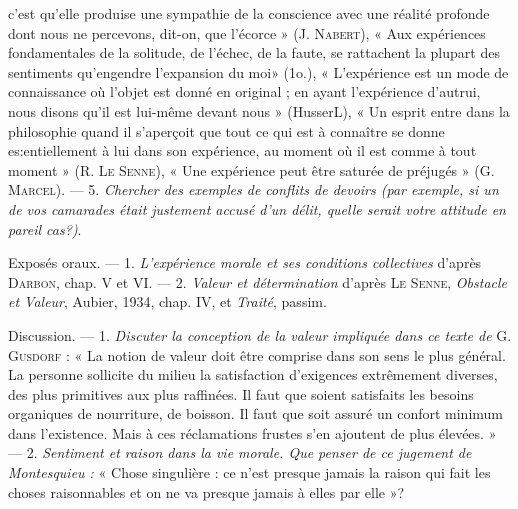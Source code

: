 c’est qu’elle produise une sympathie de la conscience avec une réalité profonde
dont nous ne percevons, dit-on, que l'écorce » (J. \textsc{Nabert}), « Aux
expériences fondamentales de la solitude, de l’échec, de la faute, se rattachent
la plupart des sentiments qu’engendre l’expansion du moi» (1o.),
« L'expérience est un mode de connaissance où l’objet est donné en original ;
en ayant l'expérience d'autrui, nous disons qu'il est lui-même devant nous »
(HusserL), « Un esprit entre dans la philosophie quand il s'aperçoit que
tout ce qui est à connaître se donne es:entiellement à lui dans son expérience,
au moment où il est comme à tout moment » (R. \textsc{Le Senne}), « Une
expérience peut être saturée de préjugés » (G. \textsc{Marcel}). — 5. {\it Chercher des
exemples de conflits de devoirs (par exemple, si un de vos camarades était justement
accusé d'un délit, quelle serait votre attitude en pareil cas?)}.

Exposés oraux. — 1. {\it L'expérience morale et ses conditions collectives}
d’après \textsc{Darbon}, chap. V et VI. — 2. {\it Valeur et détermination} d’après
\textsc{Le Senne}, {\it Obstacle et Valeur}, Aubier, 1934, chap. IV, et {\it Traité}, passim.

Discussion. — 1. {\it Discuter la conception de la valeur impliquée dans ce texte
de} G. \textsc{Gusdorf} : « La notion de valeur doit être comprise dans son sens le
plus général. La personne sollicite du milieu la satisfaction d’exigences
extrêmement diverses, des plus primitives aux plus raffinées. Il faut que
soient satisfaits les besoins organiques de nourriture, de boisson. Il faut
que soit assuré un confort minimum dans l’existence. Mais à ces réclamations
frustes s’en ajoutent de plus élevées. » — 2. {\it Sentiment et raison dans
la vie morale. Que penser de ce jugement de Montesquieu :} « Chose singulière :
ce n’est presque jamais la raison qui fait les choses raisonnables et on ne va
presque jamais à elles par elle »?

